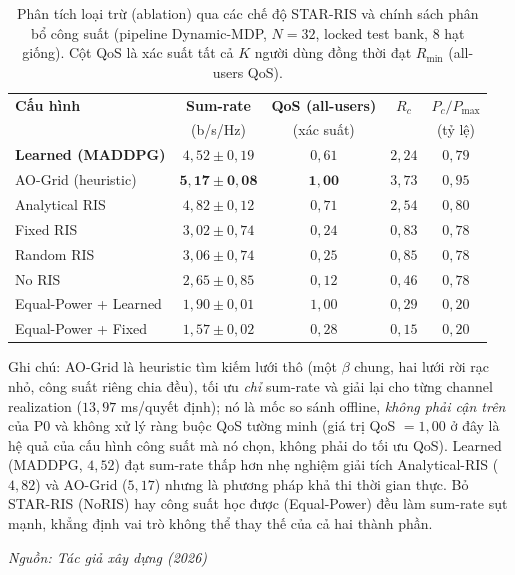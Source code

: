 \begin{table}[t]
\centering
\small
\caption{Phân tích loại trừ (ablation) qua các chế độ STAR-RIS và chính sách phân bổ công suất (pipeline Dynamic-MDP, $N=32$, locked test bank, $8$ hạt giống). Cột QoS là xác suất tất cả $K$ người dùng đồng thời đạt $R_{\min}$ (all-users QoS).}
\label{tab:ablation}
\begin{tabular}{lcccc}
\toprule
\textbf{Cấu hình}         & \textbf{Sum-rate}    & \textbf{QoS (all-users)} & \textbf{$R_c$} & \textbf{$P_c/P_{\max}$} \\
                          & (b/s/Hz)             & (xác suất)               &                & (tỷ lệ)                  \\
\midrule
\textbf{Learned (MADDPG)} & $4{,}52 \pm 0{,}19$  & $0{,}61$                 & $2{,}24$       & $0{,}79$ \\
AO-Grid (heuristic)       & $\mathbf{5{,}17 \pm 0{,}08}$ & $\mathbf{1{,}00}$ & $3{,}73$ & $0{,}95$ \\
Analytical RIS            & $4{,}82 \pm 0{,}12$  & $0{,}71$                 & $2{,}54$       & $0{,}80$ \\
Fixed RIS                 & $3{,}02 \pm 0{,}74$  & $0{,}24$                 & $0{,}83$       & $0{,}78$ \\
Random RIS                & $3{,}06 \pm 0{,}74$  & $0{,}25$                 & $0{,}85$       & $0{,}78$ \\
No RIS                    & $2{,}65 \pm 0{,}85$  & $0{,}12$                 & $0{,}46$       & $0{,}78$ \\
Equal-Power + Learned     & $1{,}90 \pm 0{,}01$  & $1{,}00$                 & $0{,}29$       & $0{,}20$ \\
Equal-Power + Fixed       & $1{,}57 \pm 0{,}02$  & $0{,}28$                 & $0{,}15$       & $0{,}20$ \\
\bottomrule
\end{tabular}

\vspace{0.2em}
{\footnotesize Ghi chú: AO-Grid là heuristic tìm kiếm lưới thô (một $\beta$ chung, hai lưới rời rạc nhỏ, công suất riêng chia đều), tối ưu \emph{chỉ} sum-rate và giải lại cho từng channel realization ($13{,}97$ ms/quyết định); nó là mốc so sánh offline, \emph{không phải cận trên} của P0 và không xử lý ràng buộc QoS tường minh (giá trị QoS $=1{,}00$ ở đây là hệ quả của cấu hình công suất mà nó chọn, không phải do tối ưu QoS). Learned (MADDPG, $4{,}52$) đạt sum-rate thấp hơn nhẹ nghiệm giải tích Analytical-RIS ($4{,}82$) và AO-Grid ($5{,}17$) nhưng là phương pháp khả thi thời gian thực. Bỏ STAR-RIS (NoRIS) hay công suất học được (Equal-Power) đều làm sum-rate sụt mạnh, khẳng định vai trò không thể thay thế của cả hai thành phần.\par}
\hfill {\footnotesize\itshape Nguồn: Tác giả xây dựng (2026)}
\end{table}
